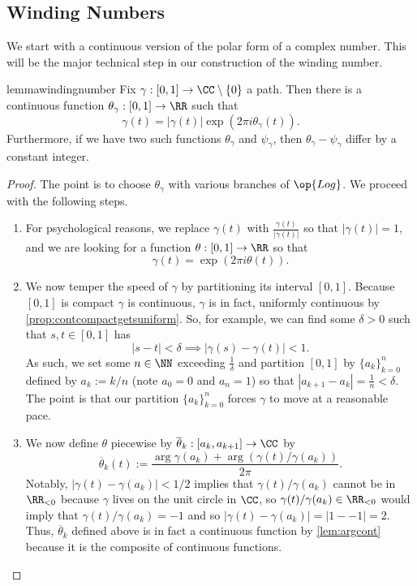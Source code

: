 \subsection{Winding Numbers}
We start with a continuous version of the polar form of a complex number. This will be the major technical step in our construction of the winding number.
\begin{restatable}{lemma}{windingnumber} \label{lem:byhandwinding}
	Fix $\gamma:[0,1]\to\CC\setminus\{0\}$ a path. Then there is a continuous function $\theta_\gamma:[0,1]\to\RR$ such that
	\[\gamma(t)=|\gamma(t)|\exp(2\pi i\theta_\gamma(t)).\]
	Furthermore, if we have two such functions $\theta_\gamma$ and $\psi_\gamma$, then $\theta_\gamma-\psi_\gamma$ differ by a constant integer.
\end{restatable}
\begin{proof}
	The point is to choose $\theta_\gamma$ with various branches of $\op{Log}$. We proceed with the following steps.
	\begin{enumerate}
		\item For psychological reasons, we replace $\gamma(t)$ with $\frac{\gamma(t)}{|\gamma(t)|}$ so that $\left|\gamma(t)\right|=1$, and we are looking for a function $\theta:[0,1]\to\RR$ so that
		\[\gamma(t)=\exp(2\pi i\theta(t)).\]
		\item We now temper the speed of $\gamma$ by partitioning its interval $[0,1]$. Because $[0,1]$ is compact $\gamma$ is continuous, $\gamma$ is in fact, uniformly continuous by \autoref{prop:contcompactgetsuniform}. So, for example, we can find some $\delta>0$ such that $s,t\in[0,1]$ has
		\[|s-t|<\delta\implies|\gamma(s)-\gamma(t)|<1.\]
		As such, we set some $n\in\NN$ exceeding $\frac1\delta$ and partition $[0,1]$ by $\{a_k\}_{k=0}^n$ defined by $a_k:=k/n$ (note $a_0=0$ and $a_n=1$) so that $|a_{k+1}-a_k|=\frac1n<\delta$. The point is that our partition $\{a_k\}_{k=0}^n$ forces $\gamma$ to move at a reasonable pace.
		\item We now define $\theta$ piecewise by $\overline\theta_k:[a_k,a_{k+1}]\to\CC$ by
		\[\overline\theta_k(t):=\frac{\arg\gamma(a_k)+\arg(\gamma(t)/\gamma(a_k))}{2\pi}.\]
		Notably, $|\gamma(t)-\gamma(a_k)|<1/2$ implies that $\gamma(t)/\gamma(a_k)$ cannot be in $\RR_{<0}$ because $\gamma$ lives on the unit circle in $\CC$, so $\gamma(t)/\gamma(a_k)\in\RR_{<0}$ would imply that $\gamma(t)/\gamma(a_k)=-1$ and so $|\gamma(t)-\gamma(a_k)|=|1--1|=2$. Thus, $\overline\theta_k$ defined above is in fact a continuous function by \autoref{lem:argcont} because it is the composite of continuous functions.


\end{enumerate}
\end{proof}
